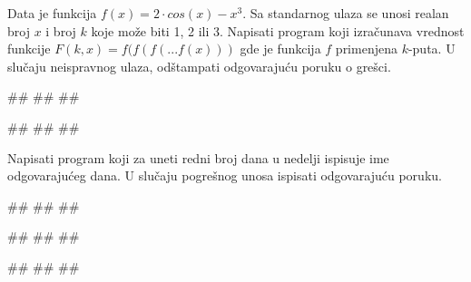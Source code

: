 \begin{Exercise}[label=p1.2_12] 
Data je funkcija $f(x) = 2 \cdot cos(x) - x^3$. Sa standarnog ulaza se
unosi realan broj $x$ i broj $k$ koje može biti 1, 2 ili 3. Napisati program koji izračunava
vrednost funkcije $F(k, x) = f(f(f(...f(x)))$ gde je funkcija $f$ primenjena $k$-puta.
U slučaju neispravnog ulaza, odštampati odgovarajuću poruku o grešci.

\begin{miditest}
\begin{upotreba}{1}
#\naslovInt#
##
##
\end{upotreba}
\end{miditest}
\begin{miditest}
\begin{upotreba}{2}
#\naslovInt#
##
##
\end{upotreba}
\end{miditest}

\end{Exercise}
\begin{Answer}[ref=p1.2_12]
\end{Answer}

\begin{Exercise}[label=p1.2_13] 
 Napisati program koji za uneti redni broj dana u nedelji ispisuje ime odgovarajućeg dana. U slučaju pogrešnog unosa ispisati odgovarajuću poruku. 
 
\begin{miditest}
\begin{upotreba}{1}
#\naslovInt#
##
##
\end{upotreba}
\end{miditest}
\begin{miditest}
\begin{upotreba}{2}
#\naslovInt#
##
##
\end{upotreba}
\end{miditest}

\begin{miditest}
\begin{upotreba}{3}
#\naslovInt#
##
##
\end{upotreba}
\end{miditest}

\end{Exercise}
\begin{Answer}[ref=p1.2_13]
\end{Answer}


